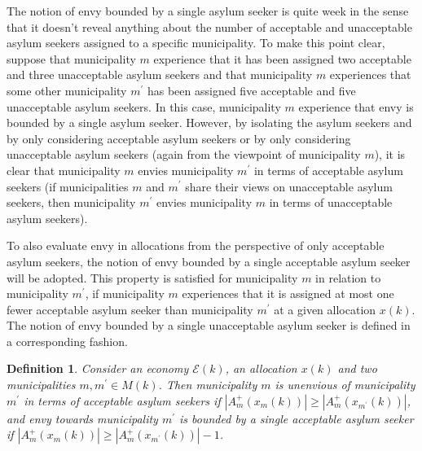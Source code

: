 \documentclass[12pt,fleqn]{article}
\newtheorem{definition}{Definition}
\begin{document}
\noindent The notion of envy bounded by a single asylum seeker is quite week in the sense that it doesn't reveal anything about the number of acceptable and unacceptable asylum seekers assigned to a specific municipality. To make this point clear, suppose that municipality $m$ experience that it has been assigned two acceptable and three unacceptable asylum seekers and that municipality $m$ experiences that some other municipality $m^\prime$ has been assigned five acceptable and five unacceptable asylum seekers. In this case, municipality $m$ experience that envy is bounded by a single asylum seeker. However, by isolating the asylum seekers and by only considering acceptable asylum seekers or by only considering unacceptable asylum seekers (again from the viewpoint of municipality $m$), it is clear that municipality $m$ envies municipality $m^\prime$ in terms of acceptable asylum seekers (if municipalities $m$ and $m^\prime$ share their views on unacceptable asylum seekers, then municipality $m^\prime$ envies municipality $m$ in terms of unacceptable asylum seekers).

To also evaluate envy in allocations from the perspective of only acceptable asylum seekers, the notion of envy bounded by a single acceptable asylum seeker will be adopted. This property is satisfied for municipality $m$ in relation to municipality $m^\prime$, if municipality $m$ experiences that it is assigned at most one fewer acceptable asylum seeker than municipality $m^\prime$ at a given allocation $x(k)$. The notion of envy bounded by a single unacceptable asylum seeker is defined in a corresponding fashion.

\begin{definition}\rm\label{DEF:1-Envy_ACC}
Consider an economy $\mathcal{E}(k)$, an allocation $x(k)$ and two municipalities $m,m^\prime\in M(k)$. Then municipality $m$ is unenvious of municipality $m^\prime$ in terms of acceptable asylum seekers if $|A_m^+(x_m(k))|\geq |A_m^+(x_{m^\prime}(k))|$, and envy towards municipality $m^\prime$ is bounded by a single acceptable asylum seeker if $|A_m^+(x_m(k))|\geq |A_m^+(x_{m^\prime}(k))|-1$.
\end{definition}
\end{document}
